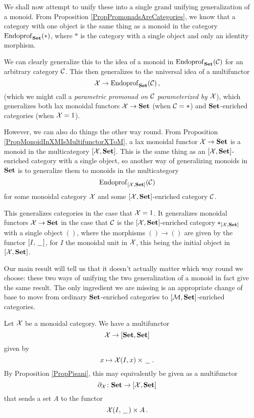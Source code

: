 We shall now attempt to unify these into a single grand unifying generalization of a monoid.
From Proposition \ref{PropPromonadsAreCategories}, we know that a category with one object is the same thing as a monoid in the category $\operatorname{Endoprof}_{\normalfont\textbf{Set}}(*)$, where $*$ is the category with a single object and only an identity morphism.

We can clearly generalize this to the idea of a monoid in $\operatorname{Endoprof}_{\normalfont\textbf{Set}}({\mathcal{C}})$ for an arbitrary category ${\mathcal{C}}$.  
This then generalizes to the universal idea of a multifunctor
\[
  \mathcal X \to \operatorname{Endoprof}_{\normalfont\textbf{Set}}({\mathcal{C}})\,,
  \]
(which we might call a \emph{parametric promonad on ${\mathcal{C}}$ parameterized by $\mathcal X$}), which generalizes both lax monoidal functors $\mathcal X \to {\normalfont\textbf{Set}}$ (when ${\mathcal{C}}=*$) and ${\normalfont\textbf{Set}}$-enriched categories (when $\mathcal X=1$).

However, we can also do things the other way round.  
From Proposition \ref{PropMonoidInXMIsMultifunctorXToM}, a lax monoidal functor $\mathcal X \to {\normalfont\textbf{Set}}$ is a monoid in the multicategory $[\mathcal X,{\normalfont\textbf{Set}}]$.  
This is the same thing as an $[\mathcal X,{\normalfont\textbf{Set}}]$-enriched category with a single object, so another way of generalizing monoids in ${\normalfont\textbf{Set}}$ is to generalize them to monoids in the multicategory
\[
  \operatorname{Endoprof}_{[\mathcal X,{\normalfont\textbf{Set}}]}({\mathcal{C}})
  \]
for some monoidal category $\mathcal X$ and some $[\mathcal X,{\normalfont\textbf{Set}}]$-enriched category ${\mathcal{C}}$.

This generalizes categories in the case that $\mathcal X=1$.  
It generalizes monoidal functors $\mathcal X \to {\normalfont\textbf{Set}}$ in the case that ${\mathcal{C}}$ is the $[\mathcal X,{\normalfont\textbf{Set}}]$-enriched category $*_{[\mathcal X,{\normalfont\textbf{Set}}]}$ with a single object $()$, where the morphisms $() \to ()$ are given by the functor $[I,\,\underline{\hspace{1.5ex}}\,]$, for $I$ the monoidal unit in $\mathcal X$, this being the initial object in $[\mathcal X,{\normalfont\textbf{Set}}]$.

Our main result will tell us that it doesn't actually matter which way round we choose: these two ways of unifying the two generalization of a monoid in fact give the same result.  
The only ingredient we are missing is an appropriate change of base to move from ordinary ${\normalfont\textbf{Set}}$-enriched categories to $[\mathcal M,{\normalfont\textbf{Set}}]$-enriched categories.

\begin{definition}
  Let $\mathcal X$ be a monoidal category.  
  We have a multifunctor
  \[
    \mathcal X \to [{\normalfont\textbf{Set}},{\normalfont\textbf{Set}}]
    \]
  given by
  \[
    x \mapsto \mathcal X(I,x) \times \,\underline{\hspace{1.5ex}}\,\,.
    \]
  By Proposition \ref{PropPisani}, this may equivalently be given as a multifunctor
  \[
    \partial_\mathcal X\colon{\normalfont\textbf{Set}} \to [\mathcal X,{\normalfont\textbf{Set}}]
    \]
  that sends a set $A$ to the functor
  \[
    \mathcal X(I,\,\underline{\hspace{1.5ex}}\,)\times A\,.
    \]
\end{definition}


